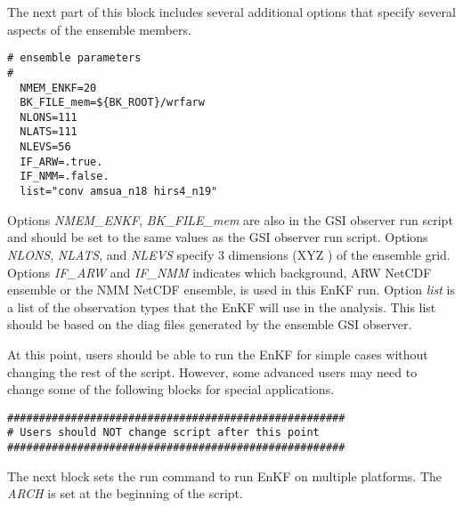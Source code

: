 The next part of this block includes several additional options that specify several aspects of the ensemble members.

\begin{scriptsize}
\begin{verbatim}
# ensemble parameters
#
  NMEM_ENKF=20
  BK_FILE_mem=${BK_ROOT}/wrfarw
  NLONS=111
  NLATS=111
  NLEVS=56
  IF_ARW=.true.
  IF_NMM=.false.
  list="conv amsua_n18 hirs4_n19"
\end{verbatim}
\end{scriptsize}

Options \textit{NMEM\_ENKF}, \textit{BK\_FILE\_mem} are also in the GSI observer run script and 
should be set to the same values as the GSI observer run script. Options \textit{NLONS}, \textit{NLATS}, 
and \textit{NLEVS} specify 3 dimensions (XYZ ) of the ensemble grid. Options \textit{IF\_ARW} and 
\textit{IF\_NMM} indicates which background, ARW NetCDF ensemble or the NMM NetCDF 
ensemble, is used in this EnKF run. Option \textit{list} is a list of the observation types that the 
EnKF will use in the analysis. This list should be based on the diag files generated by 
the ensemble GSI observer.

At this point, users should be able to run the EnKF for simple cases without changing the rest of the script. However, some advanced users may need to change some of the following blocks for special applications.
\begin{scriptsize}
\begin{verbatim}
#####################################################
# Users should NOT change script after this point
#####################################################
\end{verbatim}
\end{scriptsize}

The next block sets the run command to run EnKF on multiple platforms. The \textit{ARCH} is set at the beginning of the script.

